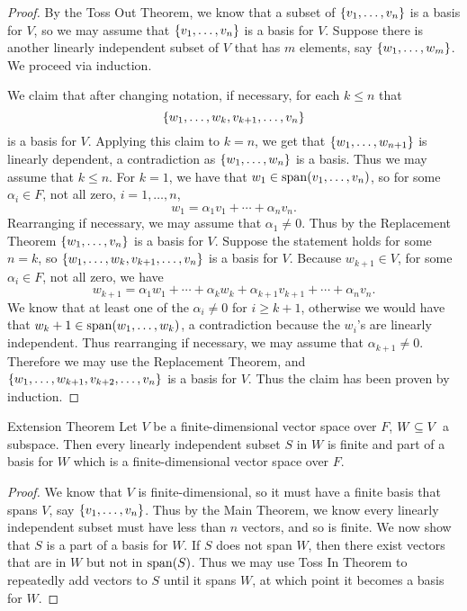\documentclass[class=article, crop=false]{standalone}
\begin{document}
  \begin{proof}
    By the Toss Out Theorem, we know that a subset of $\left\{v_1,\dotsc,v_n\right\}$ is a basis for $V$, so we may assume that $\left\{v_1,\dotsc,v_n\right\}$ is a basis for $V$. Suppose there is another linearly independent subset of $V$ that has $m$ elements, say $\left\{w_1,\dotsc,w_m\right\}$. We proceed via induction. \par
    We claim that after changing notation, if necessary, for each $k\leq n$ that
    \[
      \left\{w_1,\dotsc,w_k, v_{k+1},\dotsc,v_n\right\}
    \]
    is a basis for $V$. Applying this claim to $k = n$, we get that $\left\{w_1,\dotsc,w_{n+1}\right\}$ is linearly dependent, a contradiction as $\left\{w_1,\dotsc,w_n\right\}$ is a basis. Thus we may assume that $k\leq n$. For $k = 1$, we have that $w_1\in \operatorname{span}(v_1,\dotsc,v_n)$, so for some $\alpha_i\in F$, not all zero, $i = 1,\dotsc,n$,
    \[
      w_1 = \alpha_1v_1 + \dotsb + \alpha_nv_n.
    \]
    Rearranging if necessary, we may assume that $\alpha_1\neq 0$. Thus by the Replacement Theorem $\left\{w_1,\dotsc,v_n\right\}$ is a basis for $V$. Suppose the statement holds for some $n = k$, so $\left\{w_1,\dotsc,w_k,v_{k+1},\dotsc,v_n\right\}$ is a basis for $V$. Because $w_{k+1}\in V$, for some $\alpha_i\in F$, not all zero, we have
    \[
      w_{k+1} = \alpha_1w_1 + \dotsb + \alpha_kw_k + \alpha_{k+1}v_{k+1} + \dotsb +  \alpha_nv_n.
    \]
    We know that at least one of the $\alpha_i \neq 0$ for $i \geq k+1$, otherwise we would have that $w_k+1\in \operatorname{span}(w_1,\dotsc,w_k)$, a contradiction because the $w_i$'s are linearly independent. Thus rearranging if necessary, we may assume that $\alpha_{k+1}\neq 0$. Therefore we may use the Replacement Theorem, and $\left\{w_1,\dotsc,w_{k+1},v_{k+2},\dotsc,v_n\right\}$ is a basis for $V$. Thus the claim has been proven by induction.
  \end{proof}
  \newpage
  \begin{theorem}{Extension Theorem}
    Let $V$ be a finite-dimensional vector space over $F$, $W\subseteq V$ a subspace. Then every linearly independent subset $S$ in $W$ is finite and part of a basis for $W$ which is a finite-dimensional vector space over $F$.
  \end{theorem}
  \begin{proof}
    We know that $V$ is finite-dimensional, so it must have a finite basis that spans $V$, say $\left\{v_1,\dotsc,v_n\right\}$. Thus by the Main Theorem, we know every linearly independent subset must have less than $n$ vectors, and so is finite. We now show that $S$ is a part of a basis for $W$. If $S$ does not span $W$, then there exist vectors that are in $W$ but not in $\operatorname{span}(S)$. Thus we may use Toss In Theorem to repeatedly add vectors to $S$ until it spans $W$, at which point it becomes a basis for $W$.
  \end{proof}
\end{document}
